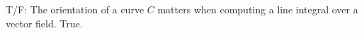 {T/F: The orientation of a curve $C$ matters when computing a line integral over a vector field.
}
{True.
}
